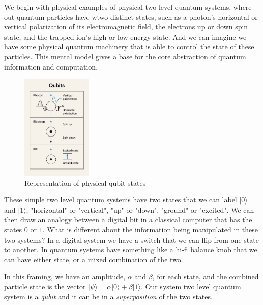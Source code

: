 We begin with physical examples of physical two‑level quantum systems, 
where out quantum particles have wtwo distinct states, such as a photon's horizontal or vertical polarization of its electromagnetic field, 
the electrons up or down spin state, and the trapped ion's high or low energy state.
And we can imagine we have some physical quantum machinery that is able to control the state of these particles.
This mental model gives a base for the core abstraction of quantum information and computation.

\begin{figure}[ht]
	\begin{adjustbox}{center}
		\includegraphics[width=0.3\textwidth, inner]{figures/physical_qubits_2.png}
	\end{adjustbox}
	\caption{Representation of physical qubit states} %
\label{fig:phys_qubit}
\end{figure}

These simple two level quantum systems have two states that we can label $\lvert0\rangle$ and $\lvert1\rangle$;
"horizontal" or "vertical", "up" or "down", "ground" or "excited".
We can then draw an analogy between a digital bit in a classical computer that has the states $0$ or $1$.
What is different about the information being manipulated in these two systems?
In a digital system we have a switch that we can flip from one state to another.
In quantum systems have something like a hi-fi balance knob that we can have either state,
or a mixed combination of the two.

In this framing, we have an amplitude, $\alpha$ and $\beta$, for each state, 
and the combined particle state is the vector $\lvert\psi\rangle = \alpha \lvert0\rangle + \beta \lvert1\rangle$.
Our system two level quantum system is a \emph{qubit} and it can be in a \emph{superposition} of the two states.

